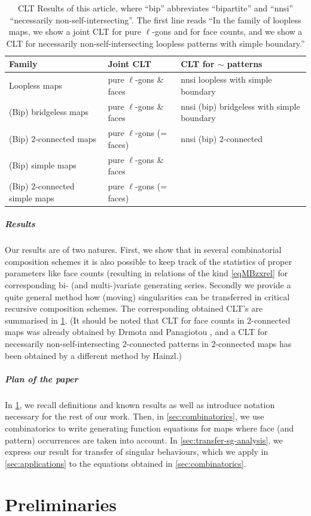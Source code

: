 \documentclass[a4paper,UKenglish,cleveref, autoref, thm-restate]{lipics-v2021}
\renewcommand{\(}{\left(}
\renewcommand{\)}{\right)}
\newcommand{\nnsi}{necessarily non-self-intersecting}
\newcommand{\ellgon}{pure \texorpdfstring{$\ell$}{ell}-gon}
\newcommand{\ellgons}{\ellgon s}
\begin{document}
\begin{table}
\begin{tabular}{l | l l}
Family & Joint CLT & CLT for $\sim$ patterns \\
\hline
Loopless maps & \ellgons{} \& faces & nnsi loopless with simple boundary \\
(Bip) bridgeless maps & \ellgons{} \& faces & nnsi (bip) bridgeless  with simple boundary \\
(Bip) $2$-connected maps & \ellgons{} (= faces) & nnsi (bip) $2$-connected\\
(Bip) simple maps & \ellgons{} \& faces &\\
(Bip) $2$-connected simple maps &\ellgons{} (= faces) &
\end{tabular}
\caption{CLT Results of this article, where ``bip'' abbreviates ``bipartite'' and ``nnsi'' ``\nnsi''. The first line reads ``In the family of loopless maps, we show a joint CLT for \ellgons{} and for face counts, and we show a CLT for \nnsi{} loopless patterns with simple boundary.''}
\label{tab:results}
\end{table}

\subparagraph{Results} Our results are of two natures. First, we show that in several combinatorial 
composition schemes it is also possible to keep track of the statistics of proper parameters like
face counts (resulting in relations of the kind \cref{eqMBzxrel} for corresponding
bi- (and multi-)variate generating series. Secondly we provide a quite general method
how (moving) singularities can be transferred in critical recursive composition schemes.
The corresponding obtained CLT's are summarised in \cref{tab:results}.
(It should be noted that CLT for face counts in $2$-connected maps was already obtained 
by Drmota and Panagiotou \cite{DP13}, and a CLT for \nnsi{} $2$-connected patterns in $2$-connected maps has been obtained by a different method by Hainzl.)

\subparagraph{Plan of the paper} In \cref{sec:defin-notation}, we recall definitions and known results as well as introduce notation necessary for the rest of our work. Then, in \cref{sec:combinatorics}, we use combinatorics to write generating function equations for maps where face (and pattern) occurrences are taken into account. In \cref{sec:transfer-sg-analysis}, we express our result for transfer of singular behaviours, which we apply in \cref{sec:applications} to the equations obtained in \cref{sec:combinatorics}.

\section{Preliminaries}
\label{sec:defin-notation}
\end{document}
